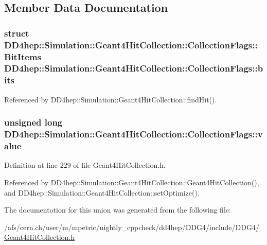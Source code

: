 \subsection{Member Data Documentation}
\hypertarget{union_d_d4hep_1_1_simulation_1_1_geant4_hit_collection_1_1_collection_flags_af42792808f44426300dfd74c4dac5d89}{
\subsubsection[{bits}]{\setlength{\rightskip}{0pt plus 5cm}struct {\bf DD4hep::Simulation::Geant4HitCollection::CollectionFlags::BitItems}                     {\bf DD4hep::Simulation::Geant4HitCollection::CollectionFlags::bits}}}
\label{union_d_d4hep_1_1_simulation_1_1_geant4_hit_collection_1_1_collection_flags_af42792808f44426300dfd74c4dac5d89}


Referenced by DD4hep::Simulation::Geant4HitCollection::findHit().\hypertarget{union_d_d4hep_1_1_simulation_1_1_geant4_hit_collection_1_1_collection_flags_a41662e93df084e0be2823219e1b09934}{
\subsubsection[{value}]{\setlength{\rightskip}{0pt plus 5cm}unsigned long {\bf DD4hep::Simulation::Geant4HitCollection::CollectionFlags::value}}}
\label{union_d_d4hep_1_1_simulation_1_1_geant4_hit_collection_1_1_collection_flags_a41662e93df084e0be2823219e1b09934}


Definition at line 229 of file Geant4HitCollection.h.

Referenced by DD4hep::Simulation::Geant4HitCollection::Geant4HitCollection(), and DD4hep::Simulation::Geant4HitCollection::setOptimize().

The documentation for this union was generated from the following file:\begin{DoxyCompactItemize}
\item 
/afs/cern.ch/user/m/mpetric/nightly\_\-cppcheck/dd4hep/DDG4/include/DDG4/\hyperlink{_geant4_hit_collection_8h}{Geant4HitCollection.h}\end{DoxyCompactItemize}
